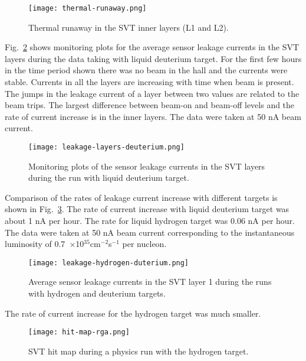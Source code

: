 \begin{figure}[hbt] 
\centering 
\texttt{[image: thermal-runaway.png]}
\caption{Thermal runaway in the SVT inner layers (L1 and L2).}
\label{fig:thermal-runaway}
\end{figure}

Fig.~\ref{fig:leakage-layers-deuterium} shows monitoring plots for the average sensor leakage currents in the SVT layers during the data taking with liquid deuterium target. For the first few hours in the time period shown there was no beam in the hall and the currents were stable. Currents in all the layers are increasing with time when beam is present. The jumps in the leakage current of a layer between two values are related to the beam trips. The largest difference between beam-on and beam-off levels and the rate of current increase is in the inner layers. The data were taken at 50 nA beam current. 

\begin{figure}[hbt] 
\centering 
\texttt{[image: leakage-layers-deuterium.png]}
\caption{Monitoring plots of the sensor leakage currents in the SVT layers during the run with liquid deuterium target.}
\label{fig:leakage-layers-deuterium}
\end{figure}

Comparison of the rates of leakage current increase with different targets is shown in Fig.~\ref{fig:leakage-hydrogen-duterium}. The rate of current increase with liquid deuterium target was about 1 nA per hour. The rate for liquid hydrogen target was 0.06 nA per hour. The data were taken at 50 nA beam current corresponding to the instantaneous luminosity of 0.7~$\times$10$^{35}$cm$^{-2}$s$^{-1}$ per nucleon.

\begin{figure}[hbt] 
\centering 
\texttt{[image: leakage-hydrogen-duterium.png]}
\caption{Average sensor leakage currents in the SVT layer 1 during the runs with hydrogen and deuterium targets.}
\label{fig:leakage-hydrogen-duterium}
\end{figure}

The rate of current increase for the hydrogen target was much smaller.
\begin{figure}[hbt] 
\centering 
\texttt{[image: hit-map-rga.png]}
\caption{SVT hit map during a physics run with the hydrogen target.}
\label{fig:hit-map-rga}
\end{figure}

